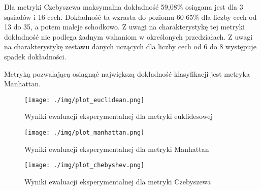 Dla metryki Czebyszewa maksymalna dokładność 59,08\% osiągana jest dla 3 sąsiadów i 16 cech. Dokładność ta wzrasta do poziomu 60-65\% dla liczby cech od 13 do 35, a potem maleje schodkowo. Z uwagi na charakterystykę tej metryki dokładność nie podlega żadnym wahaniom w określonych przedziałach. Z uwagi na charakterystykę zestawu danych uczących dla liczby cech od 6 do 8 występuje spadek dokładności.

Metryką pozwalającą osiągnąć największą dokładność klasyfikacji jest metryka Manhattan.

\begin{landscape}

    \begin{figure}[h]
        \texttt{[image: ./img/plot\_euclidean.png]}
        \caption{Wyniki ewaluacji eksperymentalnej dla metryki euklidesowej} \label{fig:euclidean}
    \end{figure}

    \begin{figure}[h]
        \texttt{[image: ./img/plot\_manhattan.png]}
        \caption{Wyniki ewaluacji eksperymentalnej dla metryki Manhattan} \label{fig:manhattan}
    \end{figure}

    \begin{figure}[h]
        \texttt{[image: ./img/plot\_chebyshev.png]}
        \caption{Wyniki ewaluacji eksperymentalnej dla metryki Czebyszewa} \label{fig:chebyshev}
    \end{figure}

\end{landscape}
